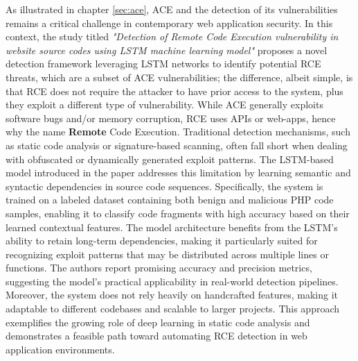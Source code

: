 \documentclass[a4paper]{usiinfbachelorproject}
\begin{document}
As illustrated in chapter \ref{sec:ace}, ACE and the detection of its vulnerabilities remains a critical challenge in contemporary web application security. In this context, the study titled \textit{"Detection of Remote Code Execution vulnerability in website source codes using LSTM machine learning model"} proposes a novel detection framework leveraging LSTM networks to identify potential RCE threats, which are a subset of ACE vulnerabilities; the difference, albeit simple, is that RCE does not require the attacker to have prior access to the system, plus they exploit a different type of vulnerability. While ACE generally exploits software bugs and/or memory corruption, RCE uses APIs or web-apps, hence why the name \textbf{Remote} Code Execution. Traditional detection mechanisms, such as static code analysis or signature-based scanning, often fall short when dealing with obfuscated or dynamically generated exploit patterns. The LSTM-based model introduced in the paper addresses this limitation by learning semantic and syntactic dependencies in source code sequences. Specifically, the system is trained on a labeled dataset containing both benign and malicious PHP code samples, enabling it to classify code fragments with high accuracy based on their learned contextual features. The model architecture benefits from the LSTM's ability to retain long-term dependencies, making it particularly suited for recognizing exploit patterns that may be distributed across multiple lines or functions. The authors report promising accuracy and precision metrics, suggesting the model's practical applicability in real-world detection pipelines. Moreover, the system does not rely heavily on handcrafted features, making it adaptable to different codebases and scalable to larger projects. This approach exemplifies the growing role of deep learning in static code analysis and demonstrates a feasible path toward automating RCE detection in web application environments.
\end{document}
